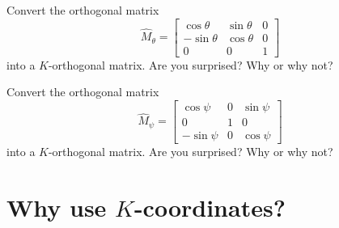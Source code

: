 \documentclass{ximera}
\begin{document}
\begin{problem}
  Convert the orthogonal matrix
  \[
  \hat{M}_\theta=\begin{bmatrix}
  \cos\theta & \sin\theta & 0\\
  -\sin\theta & \cos\theta & 0\\
  0 & 0 & 1
  \end{bmatrix}
  \]
  into a $K$-orthogonal matrix. Are you surprised? Why or why not?
\end{problem}

\begin{problem}
  Convert the orthogonal matrix
  \[
  \hat{M}_\psi=\begin{bmatrix}
  \cos\psi & 0 & \sin\psi\\
  0 & 1 & 0\\
  -\sin\psi & 0 & \cos\psi
  \end{bmatrix}
  \]
  into a $K$-orthogonal matrix. Are you surprised? Why or why not?
\end{problem}

















\section{Why use $K$-coordinates?}
\end{document}
